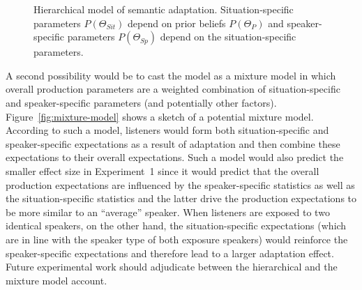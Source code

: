 \documentclass[10pt,letterpaper]{article}
\begin{document}
\begin{figure}
\center
{}
\caption{Hierarchical model of semantic adaptation. Situation-specific parameters $P(\Theta_{Sit})$ depend on prior beliefs $P(\Theta_P)$ and speaker-specific parameters $P(\Theta_{Sp})$ depend on the situation-specific parameters. \label{fig:model}}
\end{figure}



A second possibility would be to cast the model as a mixture model in which overall production parameters are a 
weighted combination of situation-specific and speaker-specific parameters (and potentially other factors). 
Figure~\ref{fig:mixture-model} shows a sketch of a potential mixture model.
According to such a model, listeners would form both situation-specific and speaker-specific
expectations as a result of adaptation and then combine these expectations to their overall expectations. 
Such a model would also predict the smaller effect size in Experiment~1 since it would predict
that the overall production expectations are influenced by the speaker-specific statistics as 
well as the situation-specific statistics and the latter drive the production expectations to be more similar to
an ``average'' speaker. When listeners are exposed to two identical speakers, on the other hand, the 
situation-specific expectations (which are in line with the speaker type of both exposure speakers) 
would reinforce the speaker-specific expectations and therefore lead to a larger adaptation effect. Future experimental work should adjudicate between the hierarchical and the mixture model account.
\end{document}
